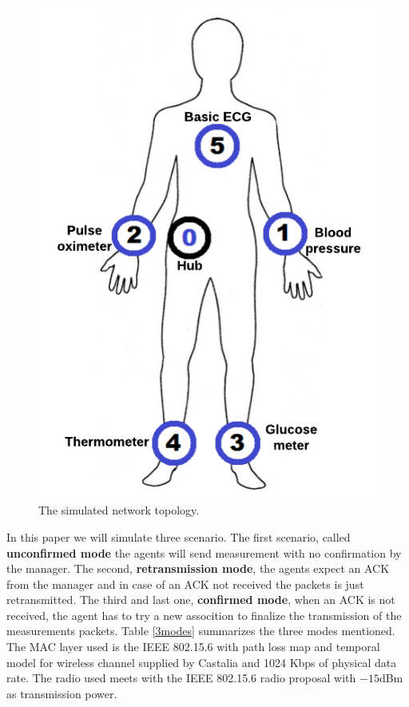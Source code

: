 \begin{figure}[htbp]
\centerline{\includegraphics[scale=0.31]{figures/corpoSensoresNomes.png}}
\caption{The simulated network topology.}
\label{fig:wbantopology}
\end{figure}

In this paper we will simulate three scenario. The first scenario, called \textbf{unconfirmed mode} the agents will send measurement with no confirmation by the manager. The second, \textbf{retransmission mode}, the agents expect an ACK from the manager and in case of an ACK not received the packets is just retransmitted. The third and last one, \textbf{confirmed mode}, when an ACK is not received, the agent has to try a new assocition to finalize the transmission of the measurements packets. Table \ref{3modes} summarizes the three modes mentioned. The MAC layer used is the IEEE 802.15.6 with path loss map and temporal model for wireless channel supplied by Castalia and 1024 Kbps of physical data rate. The radio used meets with the IEEE 802.15.6 radio proposal \cite{b5} with $-15$dBm as transmission power.

